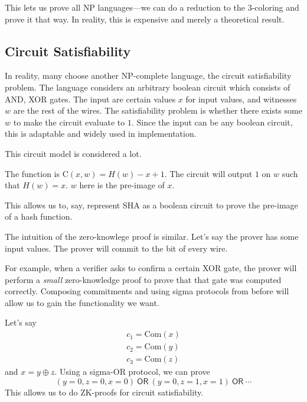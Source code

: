
This lets us prove all \textsf{NP} languages---we can do a reduction to the 3-coloring and prove it that way. In reality, this is expensive and merely a theoretical result.

\subsection{Circuit Satisfiability}
In reality, many choose another \textsf{NP}-complete language, the circuit satisfiability problem. The language considers an arbitrary boolean circuit which consists of \textsf{AND}, \textsf{XOR} gates. The input are certain values $x$ for input values, and witnesses $w$ are the rest of the wires. The satisfiability problem is whether there exists some $w$ to make the circuit evaluate to $1$. Since the input can be any boolean circuit, this is adaptable and widely used in implementation.


This circuit model is considered a lot.
\begin{example}
    The function is $\mathrm{C}(x,w) = H(w) - x + 1$. The circuit will output $1$ on $w$ such that $H(w) = x$. $w$ here is the pre-image of $x$.

    This allows us to, say, represent SHA as a boolean circuit to prove the pre-image of a hash function.
\end{example}

The intuition of the zero-knowlege proof is similar. Let's say the prover has some input values. The prover will commit to the bit of every wire.


For example, when a verifier asks to confirm a certain \textsf{XOR} gate, the prover will perform a \emph{small} zero-knowledge proof to prove that that gate was computed correctly. Composing commitments and using sigma protocols from before will allow us to gain the functionality we want.

Let's say
\begin{align*}
    c_1 = \mathrm{Com}(x) \\
    c_2 = \mathrm{Com}(y) \\
    c_3 = \mathrm{Com}(z)
\end{align*}
and $x = y\oplus z$. Using a sigma-\textsf{OR} protocol, we can prove
\[(y = 0, z = 0, x = 0)\ \mathsf{OR}\ (y = 0, z = 1, x = 1)\ \mathsf{OR}\ \cdots\]
This allows us to do ZK-proofs for circuit satisfiability.


